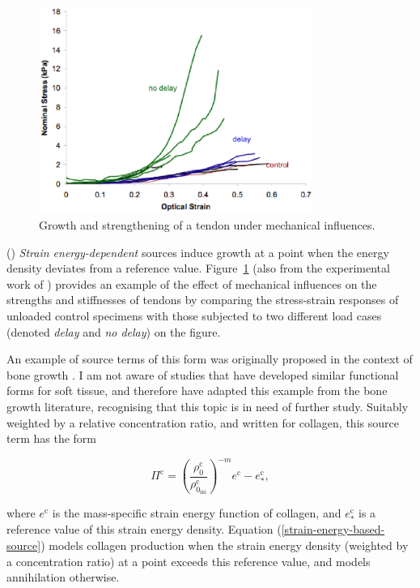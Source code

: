 \begin{figure}
  \centering
  \includegraphics[width=0.8\textwidth]{images/experiments/load-strengthening}
  \caption{Growth and strengthening of a tendon under mechanical
    influences.}
  \label{load-strengthening}
\end{figure}

() {\em Strain energy-dependent} sources induce growth
at a point when the energy density deviates from a reference
value. Figure~\ref{load-strengthening} (also from the experimental
work of \citet{calveetal:07}) provides an example of the effect of
mechanical influences on the strengths and stiffnesses of tendons by
comparing the stress-strain responses of unloaded control specimens
with those subjected to two different load cases (denoted {\em delay}
and {\em no delay}) on the figure.

An example of source terms of this form was originally proposed in the
context of bone growth \citep{HarriganHamilton:93}. I am not aware of
studies that have developed similar functional forms for soft tissue,
and therefore have adapted this example from the bone growth
literature, recognising that this topic is in need of further
study. Suitably weighted by a relative concentration ratio, and
written for collagen, this source term has the form

\begin{equation}
\Pi^\mathrm{c} = \left( \frac{\rho^\mathrm{c}_0}
   {\rho^\mathrm{c}_{0_\mathrm{ini}}} \right)^{-m}
   e^{\mathrm{c}}-e^{\mathrm{c}}_*,
\label{strain-energy-based-source}
\end{equation}

\noindent where $e^{\mathrm{c}}$ is the mass-specific strain energy
function of collagen, and $e^{\mathrm{c}}_*$ is a reference value of
this strain energy density. Equation
(\ref{strain-energy-based-source}) models collagen production when the
strain energy density (weighted by a concentration ratio) at a point
exceeds this reference value, and models annihilation otherwise.

